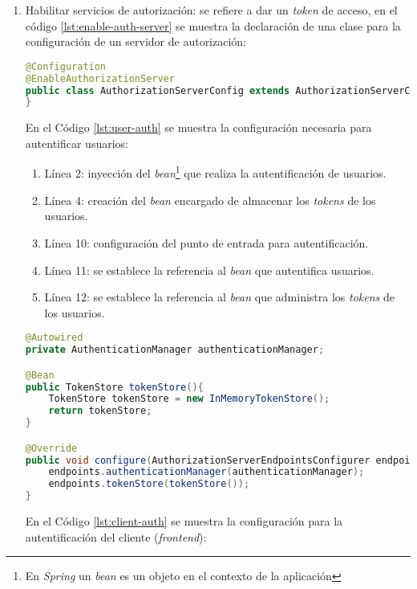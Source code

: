 \begin{enumerate}
	\item Habilitar servicios de autorización: se refiere a dar un \textit{token} de acceso, en el código \ref{lst:enable-auth-server} se muestra la declaración de una clase para la configuración de un servidor de autorización:

\begin{lstlisting}[language=Java, caption={Clase de autentificación de usuarios.}, captionpos=b, label={lst:enable-auth-server}]
@Configuration
@EnableAuthorizationServer
public class AuthorizationServerConfig extends AuthorizationServerConfigurerAdapter{
}
\end{lstlisting}

	En el Código \ref{lst:user-auth} se muestra la configuración necesaria para autentificar usuarios:
	\begin{enumerate}
		\item Línea 2: inyección del \textit{bean}\footnote{En \textit{Spring} un \textit{bean} es un objeto en el contexto de la aplicación\cite{SpringInAction}} que realiza la autentificación de usuarios.
		\item Línea 4: creación del \textit{bean} encargado de almacenar los \textit{tokens} de los usuarios.
		\item Línea 10: configuración del punto de entrada para autentificación.
		\item Línea 11: se establece la referencia al \textit{bean} que autentifica usuarios.
		\item Línea 12: se establece la referencia al \textit{bean} que administra los \textit{tokens} de los usuarios.
	\end{enumerate}

\pagebreak

\begin{lstlisting}[language=Java, caption={Configuración de autentificación de usuarios.}, captionpos=b, label={lst:user-auth}]
@Autowired
private AuthenticationManager authenticationManager;

@Bean
public TokenStore tokenStore(){
	TokenStore tokenStore = new InMemoryTokenStore();
	return tokenStore;
}

@Override
public void configure(AuthorizationServerEndpointsConfigurer endpoints) throws Exception{
	endpoints.authenticationManager(authenticationManager);
	endpoints.tokenStore(tokenStore());
}
\end{lstlisting}

	En el Código \ref{lst:client-auth} se muestra la configuración para la autentificación del cliente (\textit{frontend}):


\end{enumerate}
